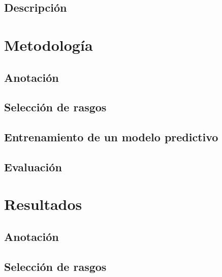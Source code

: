 \documentclass[colorinlistoftodos]{article}
\begin{document}
\subsection{Descripci\'on}\label{subsection-data-description}



\section{Metodolog\'ia}\label{section-methods}

\subsection{Anotación}\label{subsection-methods-annotation}


\subsection{Selección de rasgos}\label{subsection-methods-features}


\subsection{Entrenamiento de un modelo predictivo}\label{subsection-methods-models}


\subsection{Evaluaci\'on}\label{subsection-methods-evaluation}



\section{Resultados}\label{section-results}

\subsection{Anotación}\label{subsec-results-annotation}


\subsection{Selección de rasgos}\label{subsection-results-features}

\end{document}

